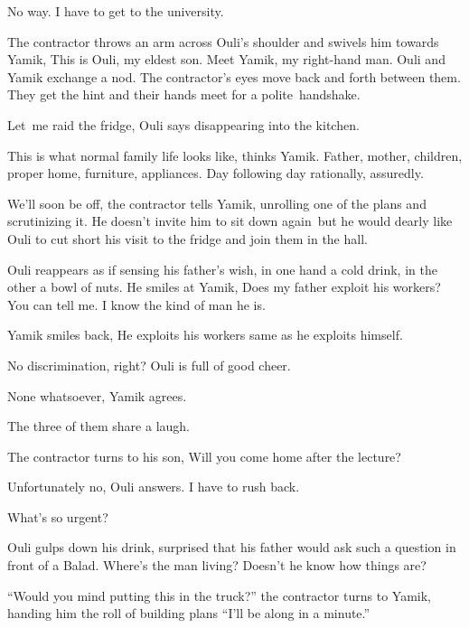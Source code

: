 \documentclass[twoside,11pt]{book}
\begin{document}
{\textquotedbl}No way. I have to get to the university.{\textquotedbl} 

The contractor throws an arm across Ouli's shoulder and swivels him towards Yamik, {\textquotedbl}This is Ouli, my
eldest son. Meet Yamik, my right{}-hand man.{\textquotedbl} Ouli and Yamik exchange a nod. The contractor's eyes move
back and forth between them. They get the hint and their hands meet for a polite~handshake. 

{\textquotedbl}Let~me raid the fridge,{\textquotedbl} Ouli says disappearing into the kitchen. 

This is what normal family life looks like, thinks Yamik. Father, mother, children, proper home, furniture, appliances.
Day following day rationally, assuredly.

{\textquotedbl}We'll soon be off,{\textquotedbl} the contractor tells Yamik, unrolling one of the plans and scrutinizing
it. He doesn't invite him to sit down again\ but he would dearly like Ouli to cut short his visit to the fridge and
join them in the hall.

Ouli reappears as if sensing his father's wish, in one hand a cold drink, in the other a bowl of nuts. He smiles at
Yamik, {\textquotedbl}Does my father exploit his workers? You can tell me. I know the kind of man he
is.{\textquotedbl}\ 

Yamik smiles back, {\textquotedbl}He exploits his workers same as he exploits himself.{\textquotedbl} 

{\textquotedbl}No discrimination, right?{\textquotedbl} Ouli is full of good cheer.

{\textquotedbl}None whatsoever,{\textquotedbl} Yamik agrees. 

The three of them share a laugh. 

The contractor turns to his son, {\textquotedbl}Will you come home after the lecture?{\textquotedbl} 

{\textquotedbl}Unfortunately no,{\textquotedbl} Ouli answers. {\textquotedbl}I have to rush back.{\textquotedbl} 

{\textquotedbl}What's so urgent?{\textquotedbl} 

Ouli gulps down his drink, surprised that his father would ask such a question in front of a Balad. Where's the man
living? Doesn't he know how things are?\ \ 

{}``Would you mind putting this in the truck?'' the contractor turns to Yamik, handing him the roll of building plans
``I{}'ll be along in a minute.''
\end{document}
